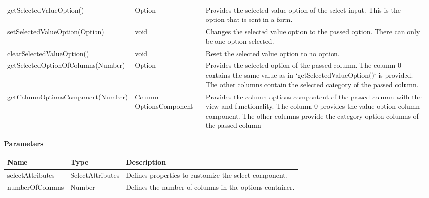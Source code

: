 \begin{table}[!htb]
\begin{tabular}{ p{5cm} p{2.3cm} p{5.2cm} }
        getSelectedValueOption()             & Option                 & Provides the selected value option of the select input. 
                                                                        This is the option that is sent in a form. \\
        setSelectedValueOption(Option)       & void                   & Changes the selected value option to the passed option. 
                                                                        There can only be one option selected.  \\
        clearSelectedValueOption()           & void                   & Reset the selected value option to no option.  \\
        getSelectedOptionOfColumns(Number)   & Option                 & Provides the selected option of the passed column. 
                                                                        The column 0 contains the same value as in `getSelectedValueOption()` is provided. 
                                                                        The other columns contain the selected category of the passed column. \\
        getColumnOptionsComponent(Number)    & \raggedright Column\-
                                               Options\-Component     & Provides the column options compontent of the passed column with the view and functionality. 
                                                                        The column 0 provides the value option column component. 
                                                                        The other columns provide the category option columns of the passed column. \\
        \bottomrule[1.2pt]
    \end{tabular}
\end{table}

\vspace*{6pt}
\noindent
\textbf{Parameters}

\begin{table}[!htb] 
    \label{api:selectControllerParameter}
    \footnotesize
    \setlength\extrarowheight{4pt}
    \begin{tabular}{ p{3.2cm} p{3cm} p{6.3cm} }
        \toprule[1.2pt]
        \textbf{Name}    & \textbf{Type}       & \textbf{Description} \\
        \midrule
        selectAttributes & SelectAttributes & Defines properties to customize the select component. \\
        numberOfColumns  & Number           & Defines the number of columns in the options container. \\
        \bottomrule[1.2pt]
    \end{tabular}
\end{table}

